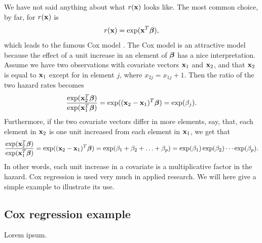 We have not said anything about what $r(\mathbf{x})$ looks like. The most common choice, by far, for $r(\mathbf{x})$ is
\begin{equation*}
    r(\mathbf{x})=\exp(\mathbf{x}^T\boldsymbol{\beta}),
\end{equation*}
which leads to the famous Cox model \citep{cox1965}. The Cox model is an attractive model because the effect of a unit increase in an element of $\boldsymbol{\beta}$ has a nice interpretation. Assume we have two observations with covariate vectors $\mathbf{x}_1$ and $\mathbf{x}_2$, and that $\mathbf{x}_2$ is equal to $\mathbf{x}_1$ except for in element $j$, where $x_{2j}=x_{1j}+1$. Then the ratio of the two hazard rates becomes
\begin{equation*}
    \frac{\exp(\mathbf{x}_2^T\boldsymbol{\beta})}{\exp(\mathbf{x}_1^T\boldsymbol{\beta})}=\exp((\mathbf{x}_2-\mathbf{x}_1)^T\boldsymbol{\beta})=\exp(\beta_j).
\end{equation*}
Furthermore, if the two covariate vectors differ in more elements, say, that, each element in $\mathbf{x}_2$ is one unit increased from each element in $\mathbf{x}_1$, we get that
\begin{equation*}
    \frac{\exp(\mathbf{x}_2^T\boldsymbol{\beta})}{\exp(\mathbf{x}_1^T\boldsymbol{\beta})}=\exp((\mathbf{x}_2-\mathbf{x}_1)^T\boldsymbol{\beta})=\exp(\beta_1+\beta_2+\ldots+\beta_p)=\exp(\beta_1)\exp(\beta_2)\cdots\exp(\beta_p).
\end{equation*}
In other words, each unit increase in a covariate is a multiplicative factor in the hazard. Cox regression is used very much in applied research. We will here give a simple example to illustrate its use.

\subsection{Cox regression example}
Lorem ipsum.

